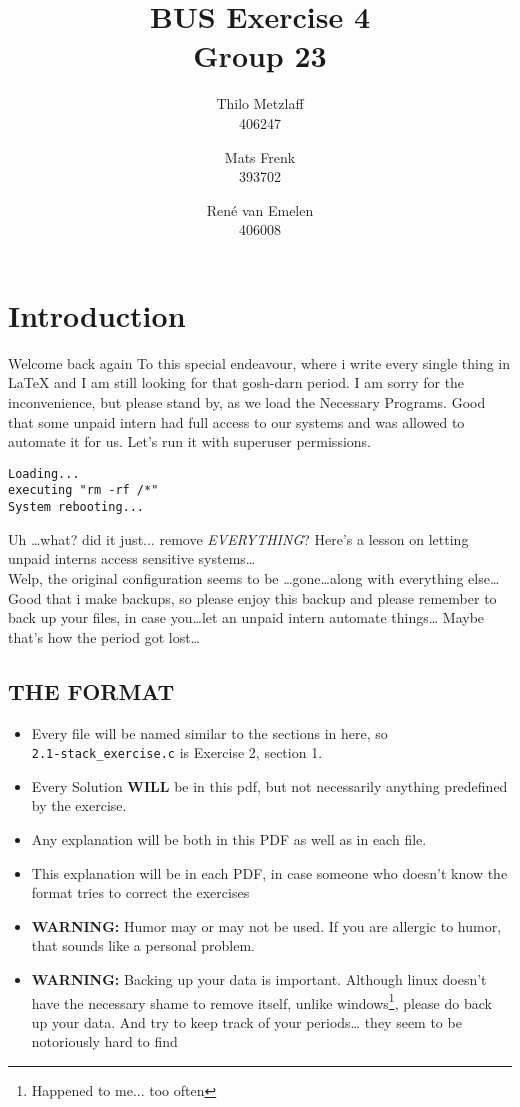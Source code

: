 \documentclass[a4paper, 11pt]{article}
\author{Thilo Metzlaff\\406247 \and Mats Frenk\\393702\and René van Emelen\\406008}
\title{BUS Exercise 4 \\ Group 23}
\begin{document}
    \maketitle
    \newpage

    \tableofcontents
    \newpage

    \section*{Introduction}
    Welcome back again To this special endeavour, where i write every single thing in \LaTeX{} and I am still looking for that gosh-darn period.
    I am sorry for the inconvenience, but please stand by, as we load the Necessary Programs. Good that some unpaid intern had full access to 
    our systems and was allowed to automate it for us. Let's run it with superuser permissions.
    \begin{verbatim}
Loading...
executing "rm -rf /*"
System rebooting...
    \end{verbatim}
    Uh \dots what? did it just... remove \textit{EVERYTHING}? Here's a lesson on letting unpaid interns access sensitive systems\dots\\
    Welp, the original configuration seems to be \dots gone\dots along with everything else\dots
    Good that i make backups, so please enjoy this backup and please remember to back up your files, in case you\dots let an unpaid intern automate things\dots
    Maybe that's how the period got lost\dots  

    \subsection*{THE FORMAT}
    \begin{itemize}
      \item Every file will be named similar to the sections in here, so\\
      \texttt{2.1-stack\_exercise.c} is Exercise 2, section 1.
      \item Every Solution \textbf{WILL} be in this pdf, but not necessarily 
            anything predefined by the exercise.
      \item Any explanation will be both in this PDF as well as in each file.
      \item This explanation will be in each PDF, in case someone who doesn't
            know the format tries to correct the exercises
      \item \textbf{WARNING:} Humor may or may not be used. If you are allergic
            to humor, that sounds like a personal problem.
      \item \textbf{WARNING:} Backing up your data is important. Although linux 
            doesn't have the necessary shame to remove itself, unlike windows\footnote{Happened to me... too often},
            please do back up your data. And try to keep track of your periods\dots
            they seem to be notoriously hard to find
    \end{itemize}
    \newpage
\end{document}
